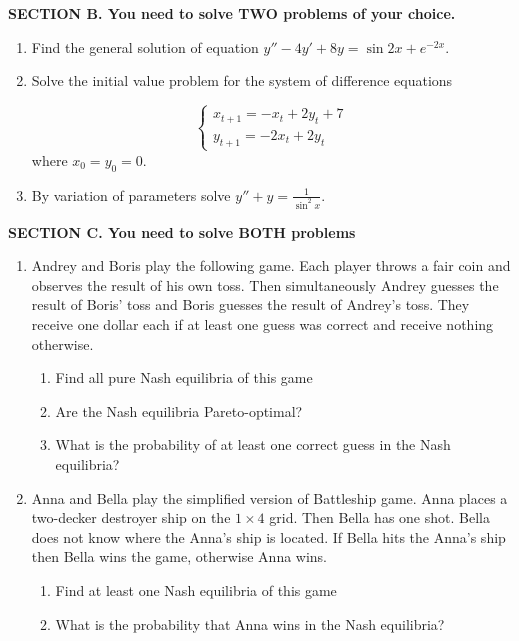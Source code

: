 \documentclass[12pt]{article} %
\theoremstyle{definition} %
\begin{document}
\textbf{SECTION B. You need to solve TWO problems of your choice. }

\begin{enumerate}[resume]

\item Find the general solution of equation $y''-4y'+8y=\sin 2x + e^{-2x}$.

\item Solve the initial value problem for the system of difference equations

\[
\begin{cases}
x_{t+1}=-x_t+2y_t+7 \\
y_{t+1}=-2x_t+2y_t
\end{cases}
\]
where $x_0=y_0=0$.

\item By variation of parameters solve $y''+y=\frac{1}{\sin^2 x}$.

\end{enumerate}

\textbf{SECTION C. You need to solve BOTH problems }

\begin{enumerate}[resume]

\item Andrey and Boris play the following game. Each player throws a fair coin and observes the result of his own toss. Then simultaneously Andrey guesses the result of Boris' toss and Boris guesses the result of Andrey's toss. They receive one dollar each if at least one guess was correct and receive nothing otherwise.

\begin{enumerate}
\item Find all pure Nash equilibria of this game
\item Are the Nash equilibria Pareto-optimal?
\item What is the probability of at least one correct guess in the Nash equilibria?
\end{enumerate}

\item Anna and Bella play the simplified version of Battleship game. Anna places a two-decker destroyer ship on the $1\times 4$ grid. Then Bella has one shot. Bella does not know where the Anna's ship is located. If Bella hits the Anna's ship then Bella wins the game, otherwise Anna wins.

\begin{enumerate}
\item Find at least one Nash equilibria of this game
\item What is the probability that Anna wins in the Nash equilibria?
\end{enumerate}


\end{enumerate}
\end{document}
